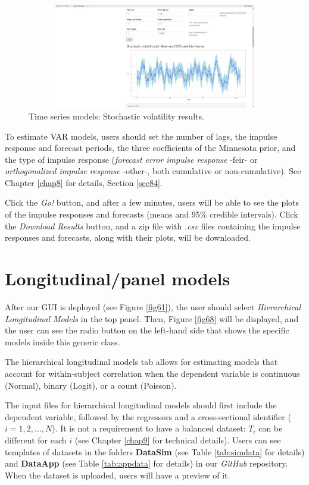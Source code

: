 \begin{figure}
	\includegraphics[width=340pt, height=130pt]{Chapters/chapterGUI/figures/Figure8c.jpg}
	\caption[List of figure caption goes here]{Time series models: Stochastic volatility results.}\label{fig8c}
\end{figure} 

To estimate VAR models, users should set the number of lags, the impulse response and forecast periods, the three coefficients of the Minnesota prior, and the type of impulse response (\textit{forecast error impulse response} -feir- or \textit{orthogonalized impulse response} -other-, both cumulative or non-cumulative). See Chapter \ref{chap8} for details, Section \ref{sec84}.

Click the \textit{Go!} button, and after a few minutes, users will be able to see the plots of the impulse responses and forecasts (means and 95\% credible intervals). Click the \textit{Download Results} button, and a zip file with \textit{.csv} files containing the impulse responses and forecasts, along with their plots, will be downloaded.

\section{Longitudinal/panel models}\label{secGUI5}
After our GUI is deployed (see Figure \ref{fig61}), the user should select \textit{Hierarchical Longitudinal Models} in the top panel. Then, Figure \ref{fig68} will be displayed, and the user can see the radio button on the left-hand side that shows the specific models inside this generic class.

The hierarchical longitudinal models tab allows for estimating models that account for within-subject correlation when the dependent variable is continuous (Normal), binary (Logit), or a count (Poisson).

The input files for hierarchical longitudinal models should first include the dependent variable, followed by the regressors and a cross-sectional identifier ($i=1,2,\dots,N$). It is not a requirement to have a balanced dataset: $T_i$ can be different for each $i$ (see Chapter \ref{chap9} for technical details). Users can see templates of datasets in the folders \textbf{DataSim} (see Table \ref{tab:simdata} for details) and \textbf{DataApp} (see Table \ref{tab:appdata} for details) in our \textit{GitHub} repository. When the dataset is uploaded, users will have a preview of it.

